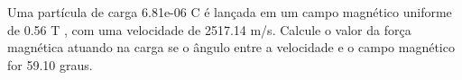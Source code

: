 \documentclass[12pt, addpoints]{exam}
\begin{document}
\begin{questions}
\begin{multicols*}{2}
\begin{oneparchoices}
\end{oneparchoices}
\question[20] Uma partícula de carga 6.81e-06 C é lançada em um campo magnético uniforme de    0.56 T , com uma velocidade de 2517.14 m/s. Calcule o valor da força magnética atuando na carga se o ângulo entre a velocidade e o campo magnético for   59.10 graus.

\begin{oneparchoices}
\end{oneparchoices}
\end{multicols*}
\end{questions}
\newpage
\end{document}
